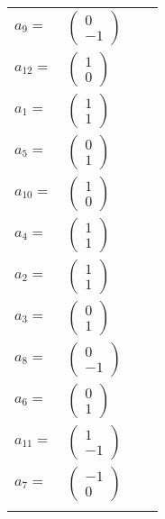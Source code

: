 \documentclass[1p]{elsarticle_modified}
\theoremstyle{definition}
\begin{document}
\begin{tabular}{m{7pt} m{180pt} m{7pt} m{180pt} }
\flushright $a_{9}=$&$\begin{pmatrix}0\\-1\end{pmatrix}$ \\
\flushright $a_{12}=$&$\begin{pmatrix}1\\0\end{pmatrix}$ \\
\flushright $a_{1}=$&$\begin{pmatrix}1\\1\end{pmatrix}$ \\
\flushright $a_{5}=$&$\begin{pmatrix}0\\1\end{pmatrix}$ \\
\flushright $a_{10}=$&$\begin{pmatrix}1\\0\end{pmatrix}$ \\
\flushright $a_{4}=$&$\begin{pmatrix}1\\1\end{pmatrix}$ \\
\flushright $a_{2}=$&$\begin{pmatrix}1\\1\end{pmatrix}$ \\
\flushright $a_{3}=$&$\begin{pmatrix}0\\1\end{pmatrix}$ \\
\flushright $a_{8}=$&$\begin{pmatrix}0\\-1\end{pmatrix}$ \\
\flushright $a_{6}=$&$\begin{pmatrix}0\\1\end{pmatrix}$ \\
\flushright $a_{11}=$&$\begin{pmatrix}1\\-1\end{pmatrix}$ \\
\flushright $a_{7}=$&$\begin{pmatrix}-1\\0\end{pmatrix}$\\&\end{tabular}
\end{document}
